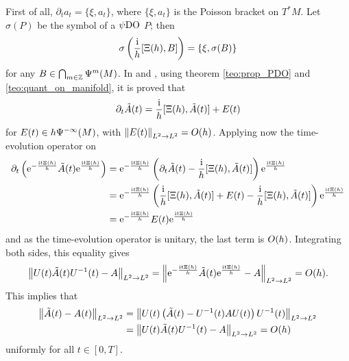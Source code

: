 \begin{prf} %
First of all, $\partial_{t}a_{t}=\{\xi,a_{t}\}$, where $\{\xi,a_{t}\}$ is the Poisson bracket on $T^{\ast}M$. Let $\sigma(P)$ be the symbol of a $\operatorname{\psi DO}$ $P$; then 
\[
\sigma\left(\frac{\mathrm{i}}{h}[\Xi(h),B]\right)=\{\xi,\sigma(B)\}
\]
for any $B\in\bigcap_{m\in\mathbb{Z}}\Psi^{m}(M)$. In \cite{Zworski:semic} and \cite{Martinez:semi}, using theorem \ref{teo:prop_PDO} and \ref{teo:quant_on_manifold}, it is proved that 
\[
\partial_{t}\tilde{A}(t)=\frac{\mathrm{i}}{h}[\Xi(h),\tilde{A}(t)]+E(t)
\]
for $E(t)\in h\Psi^{-\infty}(M)$, with $\left\lVert E(t)\right\rVert_{L^{2}\to L^{2}}=O(h)$. Applying now the time-evolution operator on 
\begin{align*}
\partial_{t}\left(\mathrm{e}^{-\frac{\mathrm{i} t\Xi(h)}{h}}\tilde{A}(t)\mathrm{e}^{\frac{\mathrm{i} t\Xi(h)}{h}}\right)&=\mathrm{e}^{-\frac{\mathrm{i} t\Xi(h)}{h}}\left(\partial_{t}\tilde{A}(t)-\frac{\mathrm{i}}{h}[\Xi(h),\tilde{A}(t)]\right)\mathrm{e}^{\frac{\mathrm{i} t\Xi(h)}{h}}\\
&=\mathrm{e}^{-\frac{\mathrm{i} t\Xi(h)}{h}}\left(\frac{\mathrm{i}}{h}[\Xi(h),\tilde{A}(t)]+E(t)-\frac{\mathrm{i}}{h}[\Xi(h),\tilde{A}(t)]\right)\mathrm{e}^{\frac{\mathrm{i} t\Xi(h)}{h}}\\
&=\mathrm{e}^{-\frac{\mathrm{i} t\Xi(h)}{h}}E(t)\mathrm{e}^{\frac{\mathrm{i} t\Xi(h)}{h}}
\end{align*}
and as the time-evolution operator is unitary, the last term is $O(h)$. Integrating both sides, this equality gives
\[
\left\lVert U(t)\tilde{A}(t)U^{-1}(t)-A\right\rVert_{L^{2}\to L^{2}}=\left\lVert \mathrm{e}^{-\frac{\mathrm{i} t\Xi(h)}{h}}\tilde{A}(t)\mathrm{e}^{\frac{\mathrm{i} t\Xi(h)}{h}}-A\right\rVert_{L^{2}\to L^{2}}=O(h).
\]
This implies that 
\begin{align*}
\left\lVert \tilde{A}(t)-A(t)\right\rVert_{L^{2}\to L^{2}}&=\left\lVert U(t)\left(
\tilde{A}(t)-U^{-1}(t)AU(t)\right)U^{-1}(t)\right\rVert_{L^{2}\to L^{2}}\\
&=\left\lVert U(t)\tilde{A}(t)U^{-1}(t)-A\right\rVert_{L^{2}\to L^{2}}=O(h)
\end{align*}
uniformly for all $t\in[0,T]$.
\end{prf}






